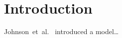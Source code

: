 \documentclass{article}
\begin{document}
{
    \section{Introduction}
    \label{sec:introduction}

    Johnson~et~al.~\cite{https://doi.org/10.48550/arxiv.1603.08155} introduced a model…





}
\end{document}
